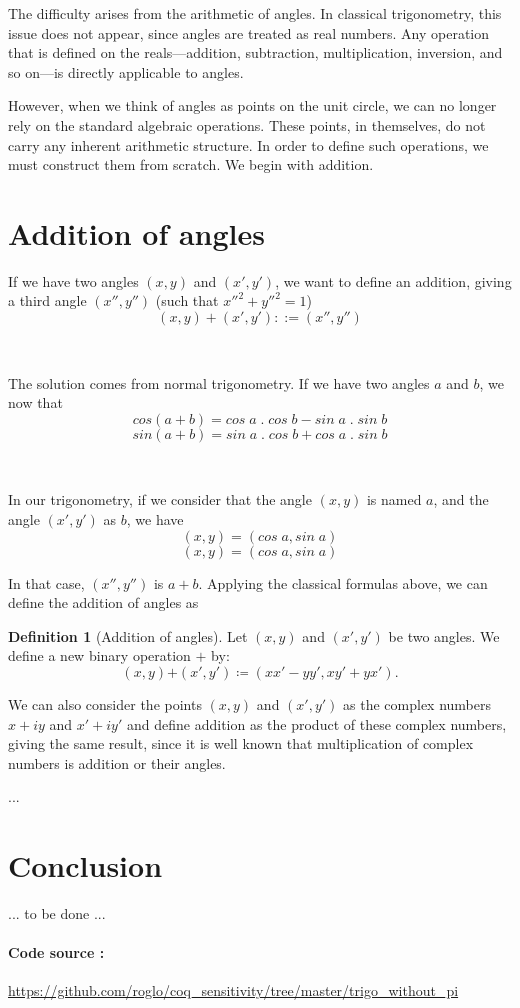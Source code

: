 \documentclass[11pt]{article}
\theoremstyle{definition}
\newtheorem{definition}{Definition}[section]
\begin{document}
The difficulty arises from the arithmetic of angles. In classical
trigonometry, this issue does not appear, since angles are treated as
real numbers. Any operation that is defined on the reals—addition,
subtraction, multiplication, inversion, and so on—is directly
applicable to angles.

However, when we think of angles as points on the unit circle, we can
no longer rely on the standard algebraic operations. These points, in
themselves, do not carry any inherent arithmetic structure. In order
to define such operations, we must construct them from scratch. We
begin with addition.

\section{Addition of angles}

If we have two angles $(x, y)$ and $(x', y')$, we want to define an
addition, giving a third angle $(x'', y'')$ (such that
$x''^2+y''^2=1$)
\[
(x, y) + (x', y') ::= (x'', y'')
\]

\

\noindent The solution comes from normal trigonometry. If we have two
angles $a$ and $b$, we now that
\[
cos(a+b) = cos\;a\;.\;cos\;b - sin\;a\;.\;sin\;b
\]
\[
sin(a+b) = sin\;a\;.\;cos\;b + cos\;a\;.\;sin\;b
\]

\

\noindent In our trigonometry, if we consider that the angle $(x, y)$
is named $a$, and the angle $(x', y')$ as $b$, we have
\[
(x, y) = (cos\;a, sin\;a)
\]
\[
(x, y) = (cos\;a, sin\;a)
\]

\noindent In that case, $(x'', y'')$ is $a + b$.  Applying the
classical formulas above, we can define the addition of angles as

\begin{definition}[Addition of angles]

Let $(x, y)$ and $(x', y')$ be two angles. We define a new binary
operation $\boldsymbol{+}$ by:
\[
(x, y) \boldsymbol{+} (x', y') \coloneqq (x x' - y y', x y' + y x').
\]

\end{definition}

\noindent We can also consider the points $(x, y)$ and $(x', y')$ as
the complex numbers $x+iy$ and $x'+iy'$ and define addition as the
product of these complex numbers, giving the same result, since it is
well known that multiplication of complex numbers is addition or their
angles.

...

\section{Conclusion}

... to be done ...

\paragraph{Code source :}
\url{https://github.com/roglo/coq_sensitivity/tree/master/trigo_without_pi}
\end{document}
